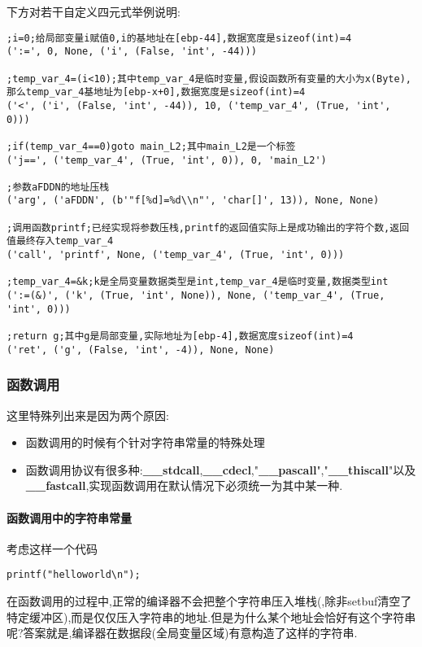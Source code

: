 \documentclass{article}
\begin{document}
下方对若干自定义四元式举例说明:

\begin{verbatim}
;i=0;给局部变量i赋值0,i的基地址在[ebp-44],数据宽度是sizeof(int)=4
(':=', 0, None, ('i', (False, 'int', -44)))

;temp_var_4=(i<10);其中temp_var_4是临时变量,假设函数所有变量的大小为x(Byte),那么temp_var_4基地址为[ebp-x+0],数据宽度是sizeof(int)=4
('<', ('i', (False, 'int', -44)), 10, ('temp_var_4', (True, 'int', 0)))

;if(temp_var_4==0)goto main_L2;其中main_L2是一个标签
('j==', ('temp_var_4', (True, 'int', 0)), 0, 'main_L2')

;参数aFDDN的地址压栈
('arg', ('aFDDN', (b'"f[%d]=%d\\n"', 'char[]', 13)), None, None)

;调用函数printf;已经实现将参数压栈,printf的返回值实际上是成功输出的字符个数,返回值最终存入temp_var_4
('call', 'printf', None, ('temp_var_4', (True, 'int', 0)))

;temp_var_4=&k;k是全局变量数据类型是int,temp_var_4是临时变量,数据类型int
(':=(&)', ('k', (True, 'int', None)), None, ('temp_var_4', (True, 'int', 0)))

;return g;其中g是局部变量,实际地址为[ebp-4],数据宽度sizeof(int)=4
('ret', ('g', (False, 'int', -4)), None, None)
\end{verbatim}

\subsubsection{函数调用}

这里特殊列出来是因为两个原因:
\begin{itemize}
\item 函数调用的时候有个针对字符串常量的特殊处理
\item 函数调用协议有很多种:\textbf{\_\_stdcall},\textbf{\_\_cdecl},"\textbf{\_\_pascall}","\textbf{\_\_thiscall}"以及\textbf{\_\_fastcall},实现函数调用在默认情况下必须统一为其中某一种.
\end{itemize}

\paragraph{函数调用中的字符串常量}
考虑这样一个代码

\begin{verbatim}
printf("helloworld\n");
\end{verbatim}

在函数调用的过程中,正常的编译器不会把整个字符串压入堆栈(,除非setbuf清空了特定缓冲区),而是仅仅压入字符串的地址.但是为什么某个地址会恰好有这个字符串呢?答案就是,编译器在数据段(全局变量区域)有意构造了这样的字符串.
\end{document}
